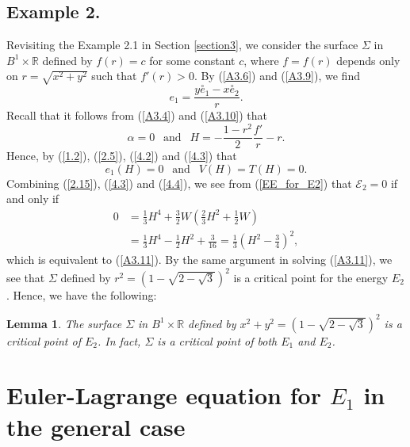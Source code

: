 \documentclass{amsart}
\newtheorem{lem}[theorem]{Lemma}
\theoremstyle{Corollary}
\numberwithin{equation}{section}
\begin{document}
\subsection{Example 2.}
Revisiting the Example 2.1 in Section \ref{section3}, we 
consider the surface $\Sigma$ in $B^1\times\mathbb{R}$ 
defined by $f(r)=c$ for some constant $c$, 
where $f=f(r)$ depends only on $r=\sqrt{x^2+y^2}$ such that $f'(r)>0$. 
By (\ref{A3.6}) and (\ref{A3.9}), 
we find 
\begin{equation}\label{4.2} 
e_1=\frac{y\overset{\circ}{e}_1-x\overset{\circ}{e}_2}{r}. 
\end{equation}
Recall that it follows from (\ref{A3.4}) and (\ref{A3.10}) 
that 
\begin{equation}\label{4.3}
\alpha=0~~\mbox{ and }~~
H=-\frac{1-r^2}{2}\frac{f'}{r}-r. 
\end{equation}
Hence, by (\ref{1.2}), (\ref{2.5}), (\ref{4.2}) and (\ref{4.3}) that 
\begin{equation}\label{4.4}
e_1(H)=0~~\mbox{ and }~~V(H)=T(H)=0.
\end{equation}
Combining (\ref{2.15}), (\ref{4.3}) and (\ref{4.4}), 
we see from (\ref{EE_for_E2}) that 
$\mathcal{E}_2=0$ if and only if 
\begin{equation}\label{4.5}
\begin{split}
0&=\frac{1}{3}H^4+\frac{3}{2}W\left(\frac{2}{3}H^2+\frac{1}{2}W\right)\\
&=\frac{1}{3}H^4-\frac{1}{2}H^2+\frac{3}{16}
=\frac{1}{3}\left(H^2-\frac{3}{4}\right)^2,
\end{split}
\end{equation}
which is equivalent to (\ref{A3.11}). 
By the same argument 
in solving (\ref{A3.11}), 
we see that 
$\Sigma$ defined by 
$r^2=(1-\sqrt{2-\sqrt{3}})^2$ is a critical point for the energy $E_2$.
Hence, we have the following: 

\begin{lem}\label{lem4.2}
The surface 
$\Sigma$ in $B^1\times\mathbb{R}$ defined by 
$x^2+y^2=(1-\sqrt{2-\sqrt{3}})^2$ is a critical point of $E_2$. 
In fact, $\Sigma$ is a critical point of both $E_1$ and $E_2$. 
\end{lem}









\section{Euler-Lagrange equation for $E_1$ in the general case}\label{section5}
\end{document}
